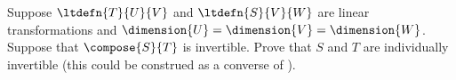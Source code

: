Suppose $\ltdefn{T}{U}{V}$ and $\ltdefn{S}{V}{W}$ are linear transformations and $\dimension{U}=\dimension{V}=\dimension{W}$.  Suppose that $\compose{S}{T}$ is invertible.  Prove that $S$ and $T$ are individually invertible (this could be construed as a converse of ).